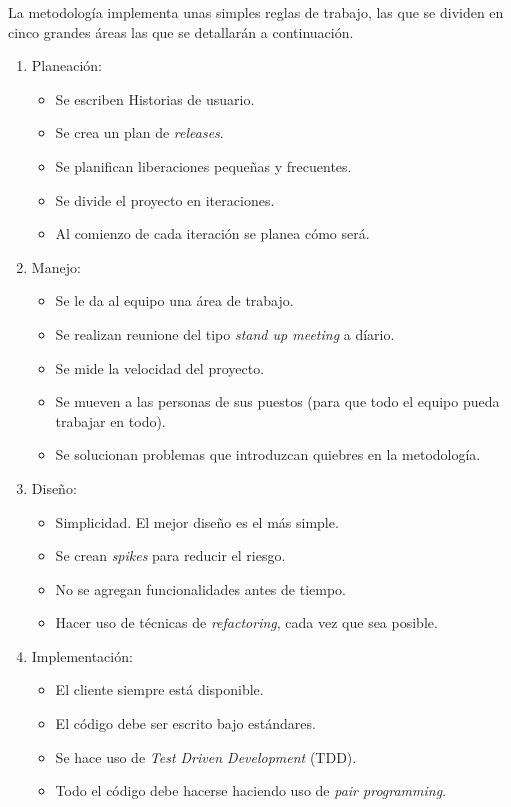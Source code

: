 La metodología implementa unas simples reglas de trabajo, las que se dividen en cinco grandes áreas las que se detallarán a continuación.

\begin{enumerate}
\item Planeación:
	\begin{itemize}
	\item Se escriben Historias de usuario. 
	\item Se crea un plan de \textit{releases}.
	\item Se planifican liberaciones pequeñas y frecuentes.
	\item Se divide el proyecto en iteraciones.
	\item Al comienzo de cada iteración se planea cómo será.
	\end{itemize}
\item Manejo:
	\begin{itemize}
	\item Se le da al equipo una área de trabajo.
	\item Se realizan reunione del tipo \textit{stand up meeting} a díario.
	\item Se mide la velocidad del proyecto. 
	\item Se mueven a las personas de sus puestos (para que todo el equipo pueda trabajar en todo).
	\item Se solucionan problemas que introduzcan quiebres en la metodología.
	\end{itemize}
\item Diseño:
	\begin{itemize}
	\item Simplicidad. El mejor diseño es el más simple.
	\item Se crean \textit{spikes} para reducir el riesgo.
	\item No se agregan funcionalidades antes de tiempo.
	\item Hacer uso de técnicas de \textit{refactoring}, cada vez que sea posible.
	\end{itemize}
\item Implementación:
	\begin{itemize}
	\item El cliente siempre está disponible. 
	\item El código debe ser escrito bajo estándares. 
	\item Se hace uso de \textit{Test Driven Development }(TDD).
	\item Todo el código debe hacerse haciendo uso de \textit{pair programming}.

\end{itemize}
\end{enumerate}
